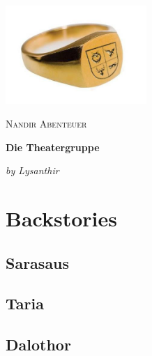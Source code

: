\documentclass[10pt,twoside,twocolumn,openany]{book}
\begin{document}
	\begin{titlepage} %
		
		\centering
		\includegraphics[width=0.40\textwidth]{NandirLogo}\par\vspace{1cm}
		{\scshape\LARGE Nandir Abenteuer \par}
		\vspace{1cm}
		{\huge\bfseries Die Theatergruppe \par}
		\vspace{2cm}
		{\Large\itshape by Lysanthir \par}
		
		\vfill
		
		
	\end{titlepage}
	
	\tableofcontents %
	\newpage %
	
	\chapter{Backstories}
	
	\section{Sarasaus}
	
	\newpage
	\section{Taria}
	
	\newpage
	\section{Dalothor}
	
	\newpage
\end{document}

